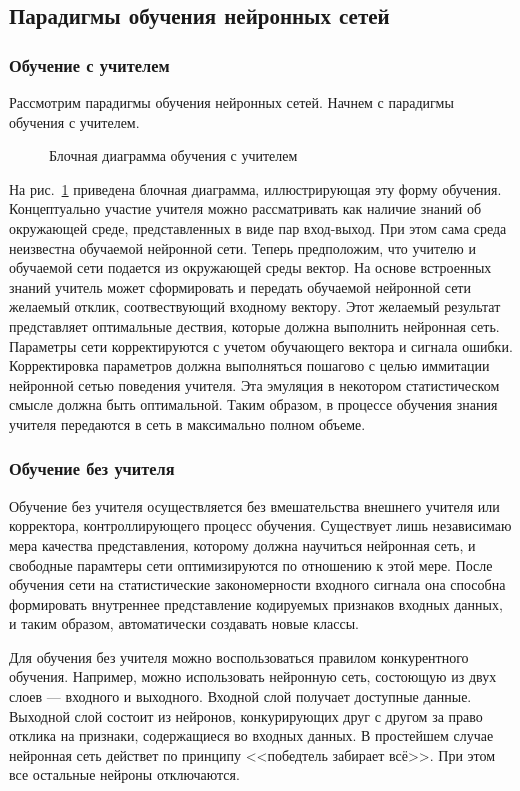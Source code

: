 \subsection{Парадигмы обучения нейронных сетей}

\subsubsection{Обучение с учителем}

Рассмотрим парадигмы обучения нейронных сетей.
Начнем с парадигмы обучения с учителем.

\begin{figure}[h]
\caption{Блочная диаграмма обучения с учителем}
\label{ris:WithTeacher}
\end{figure}

На рис.~\ref{ris:WithTeacher} приведена блочная диаграмма, иллюстрирующая эту форму обучения. 
Концептуально участие учителя можно рассматривать как наличие знаний об окружающей среде, представленных в виде пар вход-выход.
При этом сама среда неизвестна обучаемой нейронной сети.
Теперь предположим, что учителю и обучаемой сети подается  из окружающей среды вектор.
На основе встроенных знаний учитель может сформировать и передать обучаемой нейронной сети желаемый отклик, соотвествующий входному вектору.
Этот желаемый результат представляет оптимальные дествия, которые должна выполнить нейронная сеть.
Параметры сети корректируются с учетом обучающего вектора и сигнала ошибки.
Корректировка параметров должна выполняться пошагово с целью иммитации нейронной сетью поведения учителя.
Эта эмуляция в некотором статистическом смысле должна быть оптимальной.
Таким образом, в процессе обучения знания учителя передаются в сеть в максимально полном объеме.
 

\subsubsection{Обучение без учителя}

Обучение без учителя осуществляется без вмешательства внешнего учителя или корректора, контроллирующего процесс обучения.
Существует лишь независимаю мера качества представления, которому должна научиться нейронная сеть, и свободные парамтеры сети оптимизируются по отношению к этой мере.
После обучения сети на статистические закономерности входного сигнала она способна формировать внутреннее представление кодируемых признаков входных данных, и таким образом, автоматически создавать новые классы.

Для обучения без учителя можно воспользоваться правилом конкурентного обучения.
Например, можно использовать нейронную сеть, состоющую из двух слоев --- входного и выходного.
Входной слой получает доступные данные.
Выходной слой состоит из нейронов, конкурирующих друг с другом за право отклика на признаки, содержащиеся во входных данных.
В простейшем случае нейронная сеть действет по принципу <<победтель забирает всё>>.
При этом все остальные нейроны отключаются.